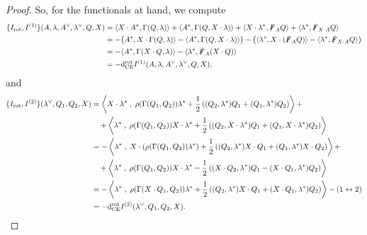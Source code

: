 \documentclass[10pt, oneside]{article}
\begin{document}
\begin{proof}
So, for the functionals at hand, we compute
\begin{align*}
\{I_{\mathrm{rot}}, I^{(1)}\}(A,\lambda, A^\vee, \lambda^\vee, Q, X) &= \langle X \cdot A^* , \Gamma(Q, \lambda)\rangle + \langle A^* , \Gamma(Q, X \cdot \lambda)\rangle + \langle X \cdot \lambda^*, \slashed{F}_A Q\rangle +  \langle\lambda^*, \slashed{F}_{X \cdot A} Q\rangle \\
&= -\big(A^* , X \cdot \Gamma(Q, \lambda)\rangle - \langle A^* , \Gamma(Q, X \cdot \lambda)\rangle\big) - \big(\langle\lambda^*, X \cdot( \slashed{F}_A Q)\rangle -  \langle\lambda^*, \slashed{F}_{X \cdot A} Q\rangle\big)\\
&= - \langle A^* , \Gamma(X \cdot Q, \lambda)\rangle - \langle\lambda^*, \slashed{F}_A (X \cdot Q)\rangle\\
&= -{\rm d}^{\mathrm{rot}}_{\mathrm{CE}} I^{(1)}(A,\lambda, A^\vee, \lambda^\vee, Q, X),
\end{align*}
and
\begin{align*}
\{I_{\mathrm{rot}}, I^{(2)}\}(\lambda^\vee, Q_1, Q_2, X) &= \left\langle X \cdot \lambda^* \;,\; \rho(\Gamma(Q_1,Q_2)) \lambda^* + \frac 12 \left((Q_2, \lambda^*)Q_1 + (Q_1, \lambda^*)Q_2\right)\right\rangle + \\
&\quad + \left\langle\lambda^* \;,\; \rho(\Gamma(Q_1,Q_2)) X \cdot \lambda^* + \frac 12 \left((Q_2, X \cdot \lambda^*)Q_1 + (Q_1, X \cdot \lambda^*)Q_2\right)\right\rangle \\
&= - \left\langle\lambda^* \;,\; X \cdot(\rho(\Gamma(Q_1,Q_2)) \lambda^*) + \frac 12 \left((Q_2, \lambda^*)X \cdot Q_1 + (Q_1, \lambda^*)X \cdot Q_2\right)\right\rangle + \\
&\quad + \left\langle\lambda^* \;,\; \rho(\Gamma(Q_1,Q_2)) X \cdot \lambda^* - \frac 12 \left((X \cdot Q_2, \lambda^*)Q_1 - (X \cdot Q_1,  \lambda^*)Q_2\right)\right\rangle \\
&= - \left\langle\lambda^* \;,\; \rho(\Gamma(X \cdot Q_1,Q_2)) \lambda^* + \frac 12 \left((Q_2, \lambda^*)X \cdot Q_1 + (X \cdot Q_1, \lambda^*)Q_2\right)\right\rangle - (1 \leftrightarrow 2)\\
&= -{\rm d}^{\mathrm{rot}}_{\mathrm{CE}} I^{(2)}(\lambda^\vee, Q_1, Q_2, X).
\end{align*}
\end{proof}
\end{document}
